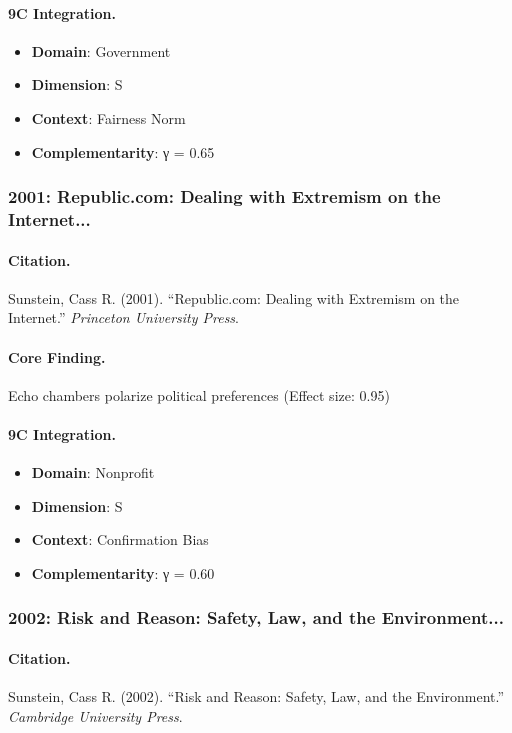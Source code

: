 \paragraph{9C Integration.}
\begin{itemize}[nosep]
  \item \textbf{Domain}: Government
  \item \textbf{Dimension}: S
  \item \textbf{Context}: Fairness Norm
  \item \textbf{Complementarity}: γ = 0.65
\end{itemize}

\subsubsection{2001: Republic.com: Dealing with Extremism on the Internet...}

\paragraph{Citation.}
Sunstein, Cass R. (2001). ``Republic.com: Dealing with Extremism on the Internet.''
\textit{Princeton University Press}.

\paragraph{Core Finding.}
Echo chambers polarize political preferences (Effect size: 0.95)

\paragraph{9C Integration.}
\begin{itemize}[nosep]
  \item \textbf{Domain}: Nonprofit
  \item \textbf{Dimension}: S
  \item \textbf{Context}: Confirmation Bias
  \item \textbf{Complementarity}: γ = 0.60
\end{itemize}

\subsubsection{2002: Risk and Reason: Safety, Law, and the Environment...}

\paragraph{Citation.}
Sunstein, Cass R. (2002). ``Risk and Reason: Safety, Law, and the Environment.''
\textit{Cambridge University Press}.

